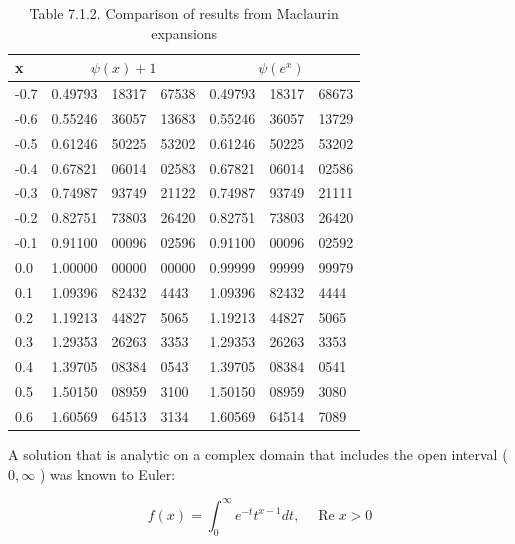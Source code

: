 \documentclass[10pt]{article}
\begin{document}
\begin{table}[h]
\begin{center}
\captionsetup{labelformat=empty}
\caption{Table 7.1.2. Comparison of results from Maclaurin expansions}
\begin{tabular}{|l|l|l|l|l|l|l|}
\hline
x & \multicolumn{3}{|c|}{$\psi(x)+1$} & \multicolumn{3}{|c|}{$\psi\left(e^{x}\right)$} \\
\hline
-0.7 & 0.49793 & 18317 & 67538 & 0.49793 & 18317 & 68673 \\
\hline
-0.6 & 0.55246 & 36057 & 13683 & 0.55246 & 36057 & 13729 \\
\hline
-0.5 & 0.61246 & 50225 & 53202 & 0.61246 & 50225 & 53202 \\
\hline
-0.4 & 0.67821 & 06014 & 02583 & 0.67821 & 06014 & 02586 \\
\hline
-0.3 & 0.74987 & 93749 & 21122 & 0.74987 & 93749 & 21111 \\
\hline
-0.2 & 0.82751 & 73803 & 26420 & 0.82751 & 73803 & 26420 \\
\hline
-0.1 & 0.91100 & 00096 & 02596 & 0.91100 & 00096 & 02592 \\
\hline
0.0 & 1.00000 & 00000 & 00000 & 0.99999 & 99999 & 99979 \\
\hline
0.1 & 1.09396 & 82432 & 4443 & 1.09396 & 82432 & 4444 \\
\hline
0.2 & 1.19213 & 44827 & 5065 & 1.19213 & 44827 & 5065 \\
\hline
0.3 & 1.29353 & 26263 & 3353 & 1.29353 & 26263 & 3353 \\
\hline
0.4 & 1.39705 & 08384 & 0543 & 1.39705 & 08384 & 0541 \\
\hline
0.5 & 1.50150 & 08959 & 3100 & 1.50150 & 08959 & 3080 \\
\hline
0.6 & 1.60569 & 64513 & 3134 & 1.60569 & 64514 & 7089 \\
\hline
\end{tabular}
\end{center}
\end{table}

A solution that is analytic on a complex domain that includes the open interval ( $0, \infty$ ) was known to Euler:


\begin{equation*}
f(x)=\int_{0}^{\infty} e^{-t} t^{x-1} d t, \quad \operatorname{Re} x>0 \tag{7.1.4}
\end{equation*}
\end{document}
